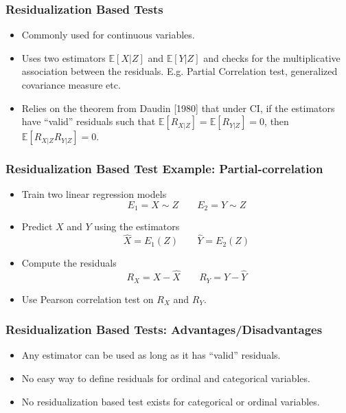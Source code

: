 \documentclass{beamer}
\begin{document}
\begin{frame}
	\frametitle{Residualization Based Tests}
	\begin{itemize}
		\setlength\itemsep{1em}
		\item Commonly used for continuous variables.
		\item Uses two estimators $ \mathbb{E}[X| Z] $ and $
			\mathbb{E}[Y | Z] $ and checks for the multiplicative
			association between the residuals. E.g.
			Partial Correlation test, generalized covariance measure etc.
		\item Relies on the theorem from Daudin [1980] \footnotemark 
			that under CI, if the estimators have ``valid'' residuals
			such that $ \mathbb{E}[R_{X|Z}] = \mathbb{E}[R_{Y|Z}] = 0 $,
			then $ \mathbb{E}[R_{X|Z} R_{Y|Z}] = 0 $.
	\end{itemize}
\end{frame}

\begin{frame}
	\frametitle{Residualization Based Test Example: Partial-correlation}
	\begin{itemize}
		\item Train two linear regression models
			$$ E_1 = X \sim Z \; \; \; \; \; \; \; E_2 = Y \sim Z $$
		\item Predict $ X $ and $ Y $ using the estimators 
			$$ \hat{X} = E_1(Z) \; \; \; \; \; \; \; \hat{Y} = E_2(Z) $$
		\item Compute the residuals
			$$ R_X = X - \hat{X} \; \; \; \; \; \; \; R_Y = Y - \hat{Y} $$
		\item Use Pearson correlation test on $ R_X $ and $ R_Y $.
	\end{itemize}
\end{frame}

\begin{frame}
	\frametitle{Residualization Based Tests: Advantages/Disadvantages}
	\begin{itemize}
		\item Any estimator can be used as long as it has ``valid'' residuals.
		\item No easy way to define residuals for ordinal and categorical variables.
		\item No residualization based test exists for categorical or ordinal variables.
	\end{itemize}
\end{frame}
\end{document}
